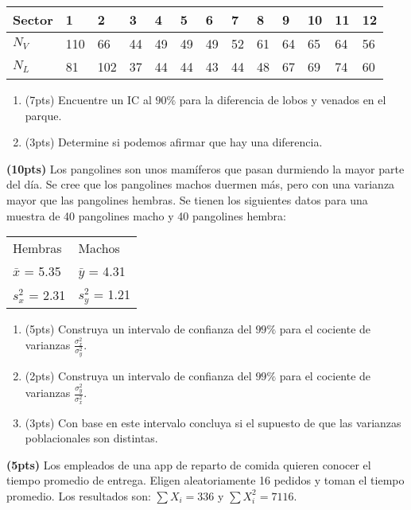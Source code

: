 \documentclass[addpoints]{exam}
\theoremstyle{mytheor}
\begin{document}
\begin{questions}
\begin{table}[h]
\centering
\begin{tabular}{lllllllllllll}
Sector & 1 & 2 & 3 & 4 & 5 & 6 & 7 & 8 & 9 & 10 & 11 & 12 \\ \hline
$N_V$ & 110 & 66 & 44 & 49 & 49 & 49 & 52 & 61 & 64 & 65 & 64 & 56 \\
$N_L$ & 81 & 102 & 37 & 44 & 44 & 43 & 44 & 48 & 67 & 69 & 74 & 60
\end{tabular}
\end{table}

\begin{enumerate}[label=\Alph*)]
\item (7pts) Encuentre un IC al $90\%$ para la diferencia de lobos y venados en el parque.
\item (3pts) Determine si podemos afirmar que hay una diferencia. 
\end{enumerate}


\question \textbf{(10pts)} Los pangolines son unos mamíferos que pasan durmiendo la mayor parte del día. Se cree que los pangolines machos duermen más, pero con una varianza mayor que las pangolines hembras. Se tienen los siguientes datos para una muestra de 40 pangolines macho y 40 pangolines hembra:

\begin{table}[h]
\centering
\begin{tabular}{ll}
Hembras & Machos \\
$\bar{x}$ = 5.35 & $\bar{y}$ = 4.31 \\
$s_x^2$ = 2.31 & $s_y^2$ = 1.21
\end{tabular}
\end{table}

\begin{enumerate}[label=\Alph*)]
\item (5pts) Construya un intervalo de confianza del $99\%$ para el cociente de varianzas $\frac{\sigma_x^2}{\sigma_y^2}$.
\item (2pts) Construya un intervalo de confianza del $99\%$ para el cociente de varianzas $\frac{\sigma_y^2}{\sigma_x^2}$.
\item (3pts) Con base en este intervalo concluya si el supuesto de que las varianzas poblacionales son distintas.
\end{enumerate}
 

 \question \textbf{(5pts)} Los empleados de una app de reparto de comida quieren conocer el tiempo promedio de entrega. Eligen aleatoriamente 16 pedidos y toman el tiempo promedio. Los resultados son: $\sum X_i = 336$ y $\sum X_i^2 = 7116$. 
  

\end{questions}
\end{document}
